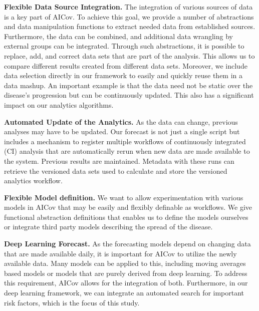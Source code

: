 \documentclass[letterpaper, inpress]{jds} %
\renewcommand{\_}{%
    \textunderscore\hspace{0pt}%
}
\begin{document}
\begin{requirement}{\bf Flexible Data Source Integration.}
  The integration of various sources of data is a key part of
  AICov. \Solution To achieve this goal, we provide a number of
  abstractions and data manipulation functions to extract needed data
  from established sources. Furthermore, the data can be combined, and
  additional data wrangling by external groups can be integrated.
  Through such abstractions, it is possible to replace, add, and
  correct data sets that are part of the analysis. This allows us to
  compare different results created from different data
  sets. Moreover, we include data selection directly in our framework
  to easily and quickly reuse them in a data mashup. An important
  example is that the data need not be static over the disease's
  progression but can be continuously updated. This also has a
  significant impact on our analytics algorithms.
\end{requirement}

\begin{requirement}{\bf Automated Update of the Analytics.}
  As the data can change, previous analyses may have to be
  updated. \Solution Our forecast is not just a single script but
  includes a mechanism to register multiple workflows of continuously
  integrated (CI) analysis that are automatically rerun when new data
  are made available to the system. Previous results are
  maintained. Metadata with these runs can retrieve the versioned data
  sets used to calculate and store the versioned analytics workflow.
\end{requirement}

\begin{requirement}{\bf Flexible Model definition.}
  We want to allow experimentation with various models in AICov that
  may be easily and flexibly definable as workflows. \Solution We give
  functional abstraction definitions that enables us to define the
  models ourselves or integrate third party models describing the
  spread of the disease.
\end{requirement}

\begin{requirement}{\bf Deep Learning Forecast.}
  As the forecasting models depend on changing data that are made
  available daily, it is important for AICov to utilize the newly
  available data. Many models can be applied to this, including moving
  averages based models or models that are purely derived from deep
  learning. \Solution To address this requirement, AICov allows for
  the integration of both. Furthermore, in our deep learning
  framework, we can integrate an automated search for important risk
  factors, which is the focus of this study.
\end{requirement}
\end{document}
